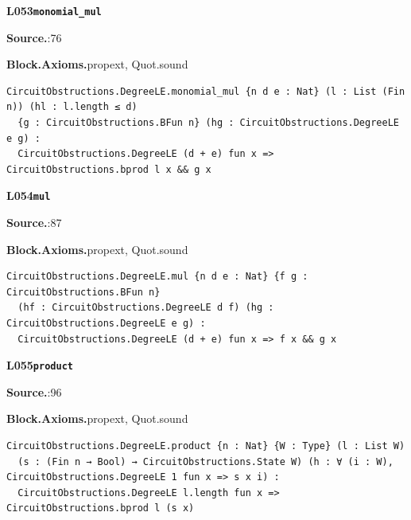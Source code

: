 \par\medskip\noindent\begin{minipage}{\textwidth}
{\small\bfseries L053\enspace\texttt{monomial\_mul}\par}
{\footnotesize\raggedright\textbf{Source.}\enspace{}:76\par
\textbf{Block.}\quad\textbf{Axioms.}\enspace propext, Quot.sound\par}\nopagebreak
\begin{lstlisting}
CircuitObstructions.DegreeLE.monomial_mul {n d e : Nat} (l : List (Fin n)) (hl : l.length ≤ d)
  {g : CircuitObstructions.BFun n} (hg : CircuitObstructions.DegreeLE e g) :
  CircuitObstructions.DegreeLE (d + e) fun x => CircuitObstructions.bprod l x && g x
\end{lstlisting}
\end{minipage}\par

\par\medskip\noindent\begin{minipage}{\textwidth}
{\small\bfseries L054\enspace\texttt{mul}\par}
{\footnotesize\raggedright\textbf{Source.}\enspace{}:87\par
\textbf{Block.}\quad\textbf{Axioms.}\enspace propext, Quot.sound\par}\nopagebreak
\begin{lstlisting}
CircuitObstructions.DegreeLE.mul {n d e : Nat} {f g : CircuitObstructions.BFun n}
  (hf : CircuitObstructions.DegreeLE d f) (hg : CircuitObstructions.DegreeLE e g) :
  CircuitObstructions.DegreeLE (d + e) fun x => f x && g x
\end{lstlisting}
\end{minipage}\par

\par\medskip\noindent\begin{minipage}{\textwidth}
{\small\bfseries L055\enspace\texttt{product}\par}
{\footnotesize\raggedright\textbf{Source.}\enspace{}:96\par
\textbf{Block.}\quad\textbf{Axioms.}\enspace propext, Quot.sound\par}\nopagebreak
\begin{lstlisting}
CircuitObstructions.DegreeLE.product {n : Nat} {W : Type} (l : List W)
  (s : (Fin n → Bool) → CircuitObstructions.State W) (h : ∀ (i : W), CircuitObstructions.DegreeLE 1 fun x => s x i) :
  CircuitObstructions.DegreeLE l.length fun x => CircuitObstructions.bprod l (s x)
\end{lstlisting}
\end{minipage}\par

